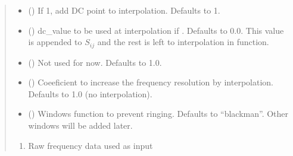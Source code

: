 \documentclass[letterpaper,10pt,english]{sphinxmanual}
\begin{document}
\begin{fulllineitems}
\begin{fulllineitems}
\begin{quote}
\begin{description}
\begin{itemize}
\item {}
\sphinxAtStartPar
{} (\sphinxstyleliteralemphasis{\sphinxupquote{, }}) \textendash{} If 1, add DC point to interpolation. Defaults to 1.

\item {}
\sphinxAtStartPar
{} (\sphinxstyleliteralemphasis{\sphinxupquote{, }}) \textendash{} dc\_value to be used at interpolation if . Defaults to 0.0. This value is appended to \(S_{i j}\) and the rest is left to interpolation in  function.

\item {}
\sphinxAtStartPar
{} (\sphinxstyleliteralemphasis{\sphinxupquote{, }}) \textendash{} Not used for now. Defaults to 1.0.

\item {}
\sphinxAtStartPar
{} (\sphinxstyleliteralemphasis{\sphinxupquote{, }}) \textendash{} Coeeficient to increase the frequency resolution by interpolation. Defaults to 1.0 (no interpolation).

\item {}
\sphinxAtStartPar
{} (\sphinxstyleliteralemphasis{\sphinxupquote{, }}) \textendash{} Windows function to prevent ringing. Defaults to “blackman”. Other windows will be added later.

\end{itemize}

\sphinxAtStartPar
\begin{description}
\begin{enumerate}
%
\item {}
\sphinxAtStartPar
Raw frequency data used as input


\end{enumerate}
\end{description}
\end{description}
\end{quote}
\end{fulllineitems}
\end{fulllineitems}
\end{document}
